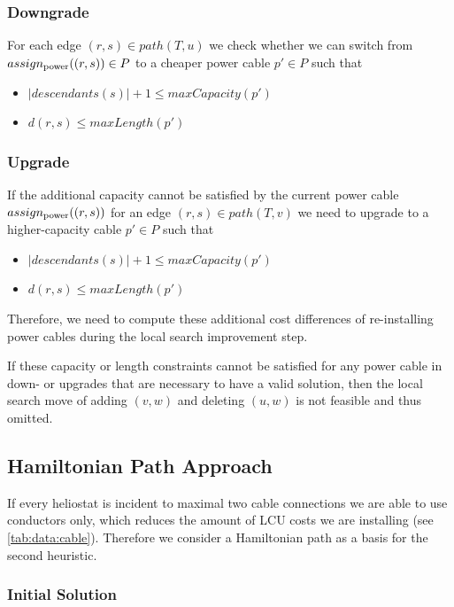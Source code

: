 \subsubsection{Downgrade}
For each edge $(r,s)\in path(T,u)$ we check whether we can switch from $assign_{\text{power}}((r,s))\in P$ to a cheaper power cable $p'\in P$ such that
\begin{itemize}
  \item $|descendants(s)| + 1 \leq maxCapacity(p')$
  \item $d(r,s) \leq maxLength(p')$
\end{itemize}

\subsubsection{Upgrade}
If the additional capacity cannot be satisfied by the current power cable $assign_{\text{power}}((r,s))$ for an edge $(r,s)\in path(T,v)$ we need to upgrade to a higher-capacity cable $p'\in P$ such that
\begin{itemize}
  \item $|descendants(s)| + 1 \leq maxCapacity(p')$
  \item $d(r,s) \leq maxLength(p')$
\end{itemize}
\noindent
Therefore, we need to compute these additional cost differences of re-installing power cables during the local search improvement step.

If these capacity or length constraints cannot be satisfied for any power cable in down- or upgrades that are necessary to have a valid solution, then the local search move of adding $(v,w)$ and deleting $(u,w)$ is not feasible and thus omitted.

\subsection{Hamiltonian Path Approach}
If every heliostat is incident to maximal two cable connections we are able to use conductors only, which reduces the amount of LCU costs we are installing (see \cref{tab:data:cable}). Therefore we consider a Hamiltonian path as a basis for the second heuristic.

\subsubsection{Initial Solution}

